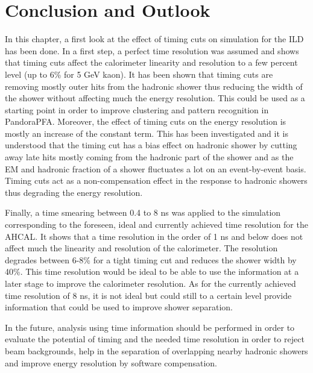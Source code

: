 \section{Conclusion and Outlook}

In this chapter, a first look at the effect of timing cuts on \geant simulation for the ILD has been done. In a first step, a perfect time resolution was assumed and shows that timing cuts affect the calorimeter linearity and resolution to a few percent level (up to 6\% for 5 GeV kaon). It has been shown that timing cuts are removing mostly outer hits from the hadronic shower thus reducing the width of the shower without affecting much the energy resolution. This could be used as a starting point in order to improve clustering and pattern recognition in PandoraPFA. Moreover, the effect of timing cuts on the energy resolution is mostly an increase of the constant term. This has been investigated and it is understood that the timing cut has a bias effect on hadronic shower by cutting away late hits mostly coming from the hadronic part of the shower and as the EM and hadronic fraction of a shower fluctuates a lot on an event-by-event basis. Timing cuts act as a non-compensation effect in the response to hadronic showers thus degrading the energy resolution.

Finally, a time smearing between 0.4 to 8 ns was applied to the simulation corresponding to the foreseen, ideal and currently achieved time resolution for the AHCAL. It shows that a time resolution in the order of 1 ns and below does not affect much the linearity and resolution of the calorimeter. The resolution degrades between 6-8\% for a tight timing cut and reduces the shower width by 40\%. This time resolution would be ideal to be able to use the information at a later stage to improve the calorimeter resolution. As for the currently achieved time resolution of 8 ns, it is not ideal but could still to a certain level provide information that could be used to improve shower separation.

In the future, analysis using time information should be performed in order to evaluate the potential of timing and the needed time resolution in order to reject beam backgrounds, help in the separation of overlapping nearby hadronic showers and improve energy resolution by software compensation.
